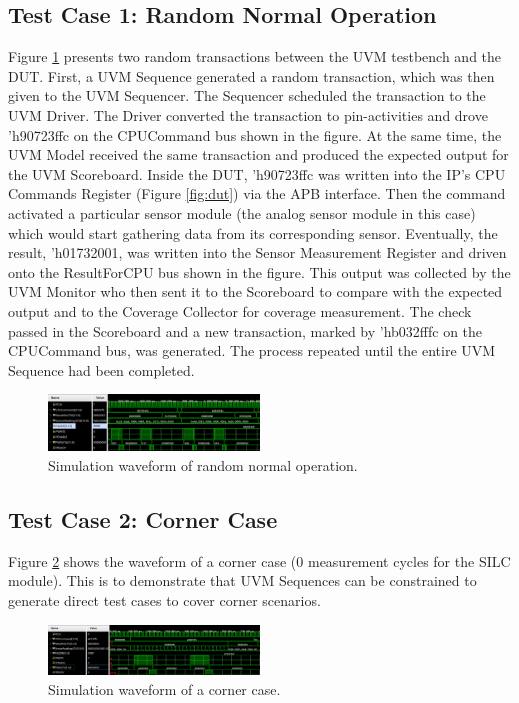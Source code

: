 \documentclass[conference]{IEEEtran}
\begin{document}
\subsection{Test Case 1: Random Normal Operation}
Figure \ref{fig:random} presents two random transactions between the UVM testbench and the DUT. First, a UVM Sequence generated a random transaction, which was then given to the UVM Sequencer. The Sequencer scheduled the transaction to the UVM Driver. The Driver converted the transaction to pin-activities and drove 'h90723ffc on the CPUCommand bus shown in the figure. At the same time, the UVM Model received the same transaction and produced the expected output for the UVM Scoreboard. Inside the DUT, 'h90723ffc was written into the IP's CPU Commands Register (Figure \ref{fig:dut}) via the APB interface. Then the command activated a particular sensor module (the analog sensor module in this case) which would start gathering data from its corresponding sensor. Eventually, the result, 'h01732001, was written into the Sensor Measurement Register and driven onto the ResultForCPU bus shown in the figure. This output was collected by the UVM Monitor who then sent it to the Scoreboard to compare with the expected output and to the Coverage Collector for coverage measurement. The check passed in the Scoreboard and a new transaction, marked by 'hb032fffc on the CPUCommand bus, was generated. The process repeated until the entire UVM Sequence had been completed.
\begin{figure}[h!]
    \centering
    \includegraphics[width = 0.5\textwidth]{figures/random.png}
    \caption{Simulation waveform of random normal operation.}
    \label{fig:random}
\end{figure}

\subsection{Test Case 2: Corner Case}
Figure \ref{fig:corner} shows the waveform of a corner case (0 measurement cycles for the SILC module). This is to demonstrate that UVM Sequences can be constrained to generate direct test cases to cover corner scenarios.

\begin{figure}[h!]
    \centering
    \includegraphics[width = 0.5\textwidth]{figures/corner.png}
    \caption{Simulation waveform of a corner case.}
    \label{fig:corner}
\end{figure}
\end{document}
